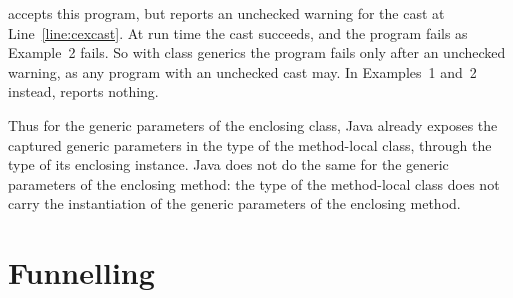 \javac accepts this program, but reports an unchecked warning for the cast at Line~\ref{line:cexcast}.
At run time the cast succeeds, and the program fails as Example~2 fails.
So with class generics the program fails only after an unchecked warning, as any program with an unchecked cast may.
In Examples~1 and~2 instead, \javac reports nothing.

Thus for the generic parameters of the enclosing class, Java already exposes the captured generic parameters in the type of the method-local class,
through the type of its enclosing instance.
Java does not do the same for the generic parameters of the enclosing method: the type of the method-local class does not carry the instantiation of the generic parameters of the enclosing method.


\section{Funnelling}
\label{sec:funnelling}

